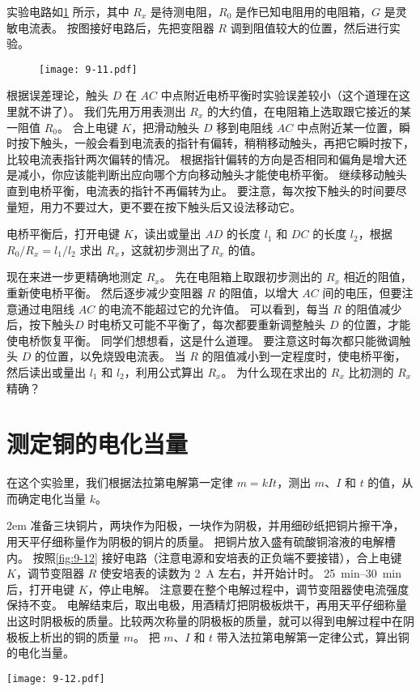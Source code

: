 实验电路如\cref{fig:9-11} 所示，其中 $R_x$ 是待测电阻，$R_0$ 是作已知电阻用的电阻箱，$G$ 是灵敏电流表。
按图接好电路后，先把变阻器 $R$ 调到阻值较大的位置，然后进行实验。
\begin{figure}
  \texttt{[image: 9-11.pdf]}  
  \caption{}\label{fig:9-11}
\end{figure}

根据误差理论，触头 $D$ 在 $AC$ 中点附近电桥平衡时实验误差较小（这个道理在这里就不讲了）。
我们先用万用表测出 $R_x$ 的大约值，在电阻箱上选取跟它接近的某一阻值 $R_0$。
合上电键 $K$，把滑动触头 $D$ 移到电阻线 $AC$ 中点附近某一位置，瞬时按下触头，一般会看到电流表的指针有偏转，稍稍移动触头，再把它瞬时按下，比较电流表指针两次偏转的情况。
根据指针偏转的方向是否相同和偏角是增大还是减小，你应该能判断出应向哪个方向移动触头才能使电桥平衡。
继续移动触头直到电桥平衡，电流表的指针不再偏转为止。
要注意，每次按下触头的时间要尽量短，用力不要过大，更不要在按下触头后又设法移动它。

电桥平衡后，打开电键 $K$，读出或量出 $AD$ 的长度 $l_1$ 和 $DC$ 的长度 $l_2$，根据 $R_0/R_x=l_1/l_2$ 求出 $R_x$，这就初步测出了$R_x$ 的值。

现在来进一步更精确地测定 $R_x$。
先在电阻箱上取跟初步测出的 $R_x$ 相近的阻值，重新使电桥平衡。
然后逐步减少变阻器 $R$ 的阻值，以增大 $AC$ 间的电压，但要注意通过电阻线 $AC$ 的电流不能超过它的允许值。
可以看到，每当 $R$ 的阻值减少后，按下触头$D$ 时电桥又可能不平衡了，每次都要重新调整触头 $D$ 的位置，才能使电桥恢复平衡。
同学们想想看，这是什么道理。
要注意这时每次都只能微调触头 $D$ 的位置，以免烧毁电流表。
当 $R$ 的阻值减小到一定程度时，使电桥平衡，然后读出或量出 $l_1$ 和 $l_2$，利用公式算出 $R_x$。
为什么现在求出的 $R_x$ 比初测的 $R_x$ 精确？

\section{测定铜的电化当量}
在这个实验里，我们根据法拉第电解第一定律 $m=kIt$，测出 $m$、$I$ 和 $t$ 的值，从而确定电化当量 $k$。

\medskip\noindent
\begin{minipage}{0.65\linewidth}\parindent2em
准备三块铜片，两块作为阳极，一块作为阴极，并用细砂纸把铜片擦干净，用天平仔细称量作为阴极的铜片的质量。
把铜片放入盛有硫酸铜溶液的电解槽内。
按照\cref{fig:9-12} 接好电路（注意电源和安培表的正负端不要接错），合上电键 $K$，调节变阻器 $R$ 使安培表的读数为 \qty{2}{A} 左右，并开始计时。
\qtyrange{25}{30}{min} 后，打开电键 $K$，停止电解。
注意要在整个电解过程中，调节变阻器使电流强度保持不变。
电解结束后，取出电极，用酒精灯把阴极板烘干，再用天平仔细称量出这时阴极板的质量。比较两次称量的阴极板的质量，就可以得到电解过程中在阴极板上析出的铜的质量 $m$。
把 $m$、$I$ 和 $t$ 带入法拉第电解第一定律公式，算出铜的电化当量。
\end{minipage}\hfill
\begin{minipage}{0.3\linewidth}\centering
  \begin{figurehere}
    \texttt{[image: 9-12.pdf]}
    \caption{}\label{fig:9-12}
  \end{figurehere}
\end{minipage}

